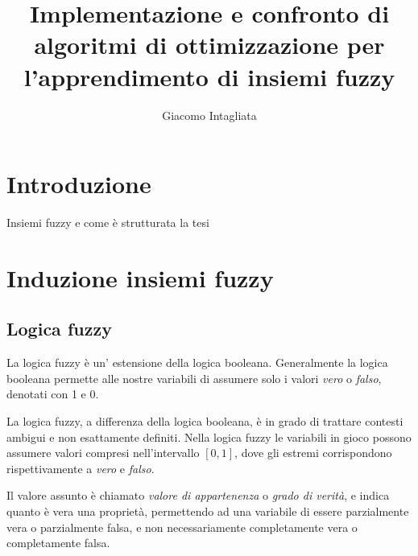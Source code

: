 \documentclass[a4paper,12pt]{report}
\begin{document}
\title{Implementazione e confronto di algoritmi di ottimizzazione per l'apprendimento di insiemi fuzzy}
\author{Giacomo Intagliata}
%
% 
%
\beforepreface

%
%
\afterpreface

%
\chapter*{Introduzione}
\label{Introduzione}
%
Insiemi fuzzy e come è strutturata la tesi
% 


\chapter{Induzione insiemi fuzzy}
\label{Capitolo 1}
\section{Logica fuzzy}
La logica fuzzy è un' estensione della logica booleana. Generalmente la logica booleana permette alle nostre variabili di assumere solo i valori \textit{vero} o \textit{falso}, denotati con 1 e 0.

La logica fuzzy, a differenza della logica booleana, è in grado di trattare contesti ambigui e non esattamente definiti.
Nella logica fuzzy le variabili in gioco possono assumere valori compresi nell'intervallo $[0,1]$, dove gli estremi corrispondono rispettivamente a \textit{vero} e \textit{falso}.

Il valore assunto è chiamato \textit{valore di appartenenza} o \textit{grado di verità}, e indica quanto è vera una proprietà, permettendo ad una variabile di essere parzialmente vera o parzialmente falsa, e non necessariamente completamente vera o completamente falsa.
\end{document}

